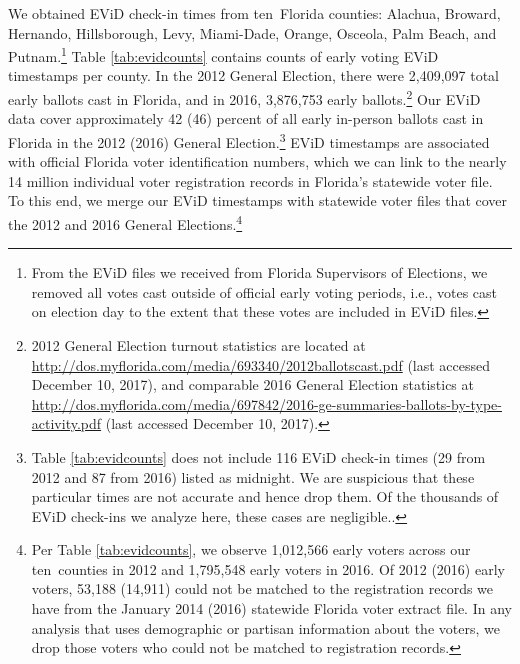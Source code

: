\documentclass[12pt,titlepage]{article}
\newcommand{\numcounties}{ten}
\begin{document}
We obtained EViD check-in times from \numcounties\ Florida counties:
Alachua, Broward, Hernando, Hillsborough, Levy, Miami-Dade, Orange,
Osceola, Palm Beach, and Putnam.\footnote{From the EViD files we
  received from Florida Supervisors of Elections, we removed all votes
  cast outside of official early voting periods, i.e., votes cast on
  election day to the extent that these votes are included in EViD
  files.}  Table \ref{tab:evidcounts} contains counts of early voting
EViD timestamps per county. In the 2012 General Election, there were
2,409,097 total early ballots cast in Florida, and in 2016, 3,876,753
early ballots.\footnote{2012 General Election turnout statistics are
  located at
  \url{http://dos.myflorida.com/media/693340/2012ballotscast.pdf}
  (last accessed December 10, 2017), and comparable 2016 General
  Election statistics at
  \url{http://dos.myflorida.com/media/697842/2016-ge-summaries-ballots-by-type-activity.pdf}
  (last accessed December 10, 2017).} Our EViD data cover
approximately 42 (46) percent of all early in-person ballots cast in
Florida in the 2012 (2016) General Election.\footnote{Table
  \ref{tab:evidcounts} does not include 116 EViD check-in times (29
  from 2012 and 87 from 2016) listed as midnight.  We are suspicious
  that these particular times are not accurate and hence drop them. Of
  the thousands of EViD check-ins we analyze here, these cases are
  negligible.\label{fn:midnight}.}  EViD timestamps are associated
with official Florida voter identification numbers, which we can link
to the nearly 14 million individual voter registration records in
Florida's statewide voter file. To this end, we merge our EViD
timestamps with statewide voter files that cover the 2012 and 2016
General Elections.\footnote{Per Table \ref{tab:evidcounts}, we observe
  1,012,566 early voters across our \numcounties\ counties in 2012 and
  1,795,548 early voters in 2016. Of 2012 (2016) early voters, 53,188
  (14,911) could not be matched to the registration records we have
  from the January 2014 (2016) statewide Florida voter extract file.
  In any analysis that uses demographic or partisan information about
  the voters, we drop those voters who could not be matched to
  registration records.}


\end{document}
